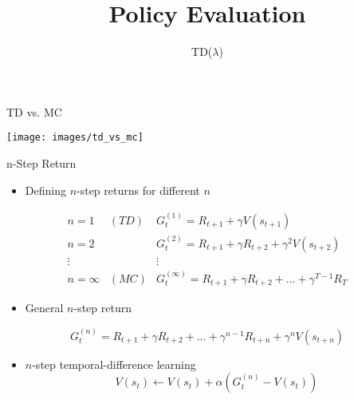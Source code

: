 \documentclass[aspectratio=169]{../latex_main/tntbeamer}  %
\title[Reinforcement Learning: Policy Evaluation]{Policy Evaluation}
\subtitle{TD($\lambda$)}
\begin{document}
	
	\maketitle


\begin{frame}[c]{TD vs. MC}

	\centering
	\vspace{-2em}
	\texttt{[image: images/td\_vs\_mc]}
	
	
\end{frame}
\begin{frame}[c]{n-Step Return}
	
\begin{itemize}
	\item Defining $n$-step returns for different $n$
\end{itemize}

\begin{eqnarray}
n=1 & (TD) & G_t^{(1)} = R_{t+1} + \gamma V(s_{t+1})\nonumber\\
n=2 &  & G_t^{(2)} = R_{t+1} + \gamma R_{t+2} + \gamma^2 V(s_{t+2})\nonumber\\
\vdots & & \vdots\nonumber\\
n = \infty & (MC) & G_t^{(\infty)} = R_{t+1} + \gamma R_{t+2} + \ldots + \gamma^{T-1} R_T\nonumber
\end{eqnarray}

\begin{itemize}
	\item General $n$-step return
\end{itemize}

$$ G_t^{(n)} =  R_{t+1} + \gamma R_{t+2} + \ldots + \gamma^{n-1} R_{t+n} + \gamma^n V(s_{t+n})$$
	
\begin{itemize}
	\item $n$-step temporal-difference learning
	$$V(s_t) \gets V(s_t) + \alpha \left(G_t^{(n)} - V(s_t)\right) $$
\end{itemize}
	
\end{frame}
\end{document}
